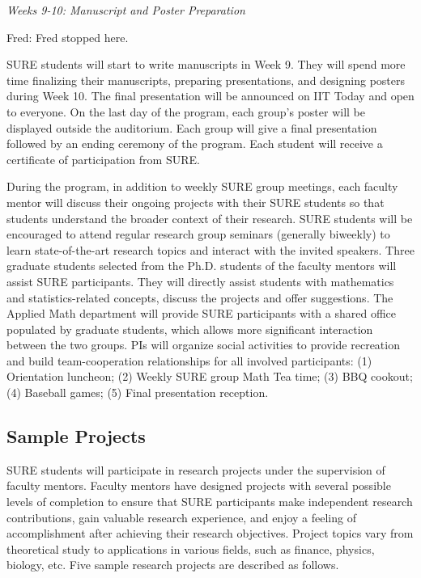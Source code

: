 \documentclass[11pt]{NSFamsart}
\newcommand{\FJHNote}[1]{{\color{blue}Fred: #1}}
\begin{document}
\centerline{\emph{Weeks 9-10: Manuscript and Poster Preparation}} \FJHNote{Fred stopped here.}

SURE students will start to
write manuscripts in Week 9. They will spend more time finalizing their manuscripts, preparing presentations, and designing posters during Week 10. The final presentation will be announced on IIT Today and open to everyone. On the last day of the program, each group's poster will be displayed outside the auditorium. Each group will give a final presentation followed by an ending ceremony of the program. Each student will receive a certificate of participation from SURE.

During the program, in addition to weekly SURE group meetings, each
faculty mentor will discuss their ongoing projects with their SURE students so that students understand the broader context of their research. SURE students will be encouraged to attend regular research group seminars (generally biweekly) to learn state-of-the-art research topics and interact
with the invited speakers. Three graduate students selected from the Ph.D. students
of the faculty mentors will assist SURE participants. They will
directly assist students with mathematics and statistics-related
concepts, discuss the projects and offer suggestions. The Applied Math department will provide SURE participants with
a shared office populated by graduate students, which
allows more significant interaction between the two groups. 
PIs will organize social activities to provide recreation
and build team-cooperation relationships for all involved participants: (1) Orientation luncheon; (2) Weekly SURE group Math Tea time; (3) BBQ
cookout; (4) Baseball games;  (5)
 Final presentation reception.

\subsection{Sample Projects }
SURE students will participate in research projects under the supervision of faculty mentors. Faculty
mentors have designed projects with several possible levels of completion to ensure that SURE participants
make independent research contributions, gain valuable research experience, and enjoy a feeling of
accomplishment after achieving their research objectives. Project topics vary from theoretical study to applications in various fields, such as finance, physics, biology, etc. Five sample research projects are described as follows.

%
\end{document}
